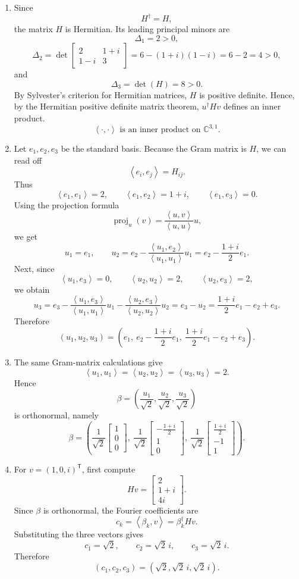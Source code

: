 \documentclass[12pt]{article}
\newcommand{\C}{\mathbb{C}}
\DeclareMathOperator{\proj}{proj}
\newcommand{\ip}[2]{\left\langle #1,#2\right\rangle}
\begin{document}
\begin{enumerate}[label=(\alph*)]
\item Since
\[
H^\dagger=H,
\]
the matrix $H$ is Hermitian. Its leading principal minors are
\[
\Delta_1=2>0,
\]
\[
\Delta_2=\det\begin{bmatrix}2&1+i\\1-i&3\end{bmatrix}
=6-(1+i)(1-i)=6-2=4>0,
\]
and
\[
\Delta_3=\det(H)=8>0.
\]
By Sylvester's criterion for Hermitian matrices, $H$ is positive definite. Hence, by the Hermitian positive definite matrix theorem,
$u^\dagger Hv$ defines an inner product.
\[
\boxed{\,\ip{\cdot}{\cdot}\text{ is an inner product on }\C^{3,1}.\,}
\]

\item Let $e_1,e_2,e_3$ be the standard basis. Because the Gram matrix is $H$, we can read off
\[
\ip{e_i}{e_j}=H_{ij}.
\]
Thus
\[
\ip{e_1}{e_1}=2,
\qquad
\ip{e_1}{e_2}=1+i,
\qquad
\ip{e_1}{e_3}=0.
\]
Using the projection formula
\[
\proj_{u}(v)=\frac{\ip{u}{v}}{\ip{u}{u}}u,
\]
we get
\[
u_1=e_1,
\qquad
u_2=e_2-\frac{\ip{u_1}{e_2}}{\ip{u_1}{u_1}}u_1
=e_2-\frac{1+i}{2}e_1.
\]
Next, since
\[
\ip{u_1}{e_3}=0,
\qquad
\ip{u_2}{u_2}=2,
\qquad
\ip{u_2}{e_3}=2,
\]
we obtain
\[
u_3=e_3-\frac{\ip{u_1}{e_3}}{\ip{u_1}{u_1}}u_1
       -\frac{\ip{u_2}{e_3}}{\ip{u_2}{u_2}}u_2
=e_3-u_2
=\frac{1+i}{2}e_1-e_2+e_3.
\]
Therefore
\[
\boxed{\,
(u_1,u_2,u_3)=\left(e_1,\ e_2-\frac{1+i}{2}e_1,\ \frac{1+i}{2}e_1-e_2+e_3\right).
\,}
\]

\item The same Gram-matrix calculations give
\[
\ip{u_1}{u_1}=\ip{u_2}{u_2}=\ip{u_3}{u_3}=2.
\]
Hence
\[
\boxed{\,
\beta=\left(\frac{u_1}{\sqrt2},\frac{u_2}{\sqrt2},\frac{u_3}{\sqrt2}\right)
\,}
\]
is orthonormal, namely
\[
\boxed{
\beta=
\left(
\frac{1}{\sqrt2}\!\begin{bmatrix}1\\0\\0\end{bmatrix},\ 
\frac{1}{\sqrt2}\!\begin{bmatrix}-\frac{1+i}{2}\\1\\0\end{bmatrix},\ 
\frac{1}{\sqrt2}\!\begin{bmatrix}\frac{1+i}{2}\\-1\\1\end{bmatrix}
\right).
}
\]

\item For $v=(1,0,i)^{\mathsf T}$, first compute
\[
Hv=\begin{bmatrix}2\\1+i\\4i\end{bmatrix}.
\]
Since $\beta$ is orthonormal, the Fourier coefficients are
\[
c_k=\ip{\beta_k}{v}=\beta_k^\dagger Hv.
\]
Substituting the three vectors gives
\[
c_1=\sqrt2,
\qquad
c_2=\sqrt2\,i,
\qquad
c_3=\sqrt2\,i.
\]
Therefore
\[
\boxed{\,(c_1,c_2,c_3)=\left(\sqrt2,\sqrt2\,i,\sqrt2\,i\right).\,}
\]
\end{enumerate}
\end{document}
